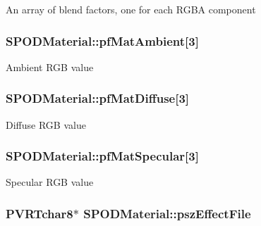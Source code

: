 An array of blend factors, one for each R\+G\+B\+A component \hypertarget{struct_s_p_o_d_material_ad3303842dda9be3c0452bf69d925078d}{
\subsubsection[{pf\+Mat\+Ambient}]{ S\+P\+O\+D\+Material\+::pf\+Mat\+Ambient\mbox{[}3\mbox{]}}}\label{struct_s_p_o_d_material_ad3303842dda9be3c0452bf69d925078d}
Ambient R\+G\+B value \hypertarget{struct_s_p_o_d_material_a635a027fd11a27fa88fbd625d2de5423}{
\subsubsection[{pf\+Mat\+Diffuse}]{ S\+P\+O\+D\+Material\+::pf\+Mat\+Diffuse\mbox{[}3\mbox{]}}}\label{struct_s_p_o_d_material_a635a027fd11a27fa88fbd625d2de5423}
Diffuse R\+G\+B value \hypertarget{struct_s_p_o_d_material_a40756a2f0cffff65f63aa8d19b5a0591}{
\subsubsection[{pf\+Mat\+Specular}]{ S\+P\+O\+D\+Material\+::pf\+Mat\+Specular\mbox{[}3\mbox{]}}}\label{struct_s_p_o_d_material_a40756a2f0cffff65f63aa8d19b5a0591}
Specular R\+G\+B value \hypertarget{struct_s_p_o_d_material_ab853f01e60472a5b90bea75ccff6ea57}{
\subsubsection[{psz\+Effect\+File}]{\setlength{\rightskip}{0pt plus 5cm}P\+V\+R\+Tchar8$\ast$ S\+P\+O\+D\+Material\+::psz\+Effect\+File}}\label{struct_s_p_o_d_material_ab853f01e60472a5b90bea75ccff6ea57}
